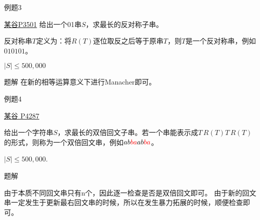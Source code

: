 \documentclass{ctexbeamer}		%
\begin{document}
\begin{frame}{例题3}

\begin{block}{\href{https://www.luogu.com.cn/problem/P3501}{某谷P3501}}
给出一个01串$S$，求最长的反对称子串。

反对称串$T$定义为：将$R(T)$逐位取反之后等于原串$T$，则$T$是一个反对称串，例如$010101$。

$|S| \leq 500, 000$
\end{block}

\pause

\begin{block}{题解}
在新的相等运算意义下进行Manacher即可。
\end{block}
    
\end{frame}

\begin{frame}{例题4}
    
\begin{block}{\href{https://www.luogu.com.cn/problem/P4287}{某谷 P4287}}

给出一个字符串$S$，求最长的双倍回文子串。若一个串能表示成$T\hspace{2pt}R(T)T\hspace{2pt}R(T)$的形式，则称为一个双倍回文串，例如$ab{\color{red}ba}ab{\color{red}ba}$。

$|S| \leq 500, 000$.

\end{block}

\pause

\begin{block}{题解}

由于本质不同回文串只有n个，因此逐一检查是否是双倍回文即可。
\pause
由于新的回文串一定发生于更新最右回文串的时候，所以在发生暴力拓展的时候，顺便检查即可。

\end{block}

\end{frame}
\end{document}
